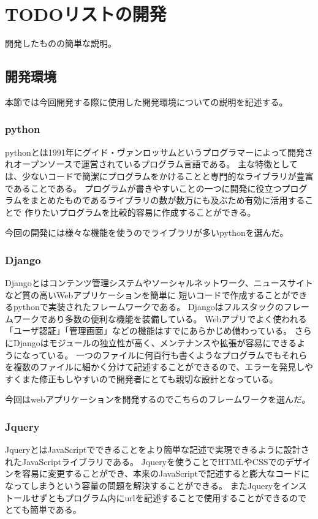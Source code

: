 \chapter{TODOリストの開発}
\label{cha:Development}
開発したものの簡単な説明。

\section{開発環境}
本節では今回開発する際に使用した開発環境についての説明を記述する。
\subsection{python}
pythonとは1991年にグイド・ヴァンロッサムというプログラマーによって開発されオープンソースで運営されているプログラム言語である。
主な特徴としては、少ないコードで簡潔にプログラムをかけることと専門的なライブラリが豊富であることである。
プログラムが書きやすいことの一つに開発に役立つプログラムをまとめたものであるライブラリの数が数万にも及ぶため有効に活用することで
作りたいプログラムを比較的容易に作成することができる。

今回の開発には様々な機能を使うのでライブラリが多いpythonを選んだ。
\subsection{Django}
Djangoとはコンテンツ管理システムやソーシャルネットワーク、ニュースサイトなど質の高いWebアプリケーションを簡単に
短いコードで作成することができるpythonで実装されたフレームワークである。
Djangoはフルスタックのフレームワークであり多数の便利な機能を装備している。
Webアプリでよく使われる「ユーザ認証」「管理画面」などの機能はすでにあらかじめ備わっている。
さらにDjangoはモジュールの独立性が高く、メンテナンスや拡張が容易にできるようになっている。
一つのファイルに何百行も書くようなプログラムでもそれらを複数のファイルに細かく分けて記述することができるので、エラーを発見しやすくまた修正もしやすいので開発者にとても親切な設計となっている。

今回はwebアプリケーションを開発するのでこちらのフレームワークを選んだ。
\subsection{Jquery}
JqueryとはJavaScriptでできることをより簡単な記述で実現できるように設計されたJavaScriptライブラリである。
Jqueryを使うことでHTMLやCSSでのデザインを容易に変更することができ、本来のJavaScriptで記述すると膨大なコードになってしまうという容量の問題を解決することができる。
またJqueryをインストールせずともプログラム内にurlを記述することで使用することができるのでとても簡単である。

